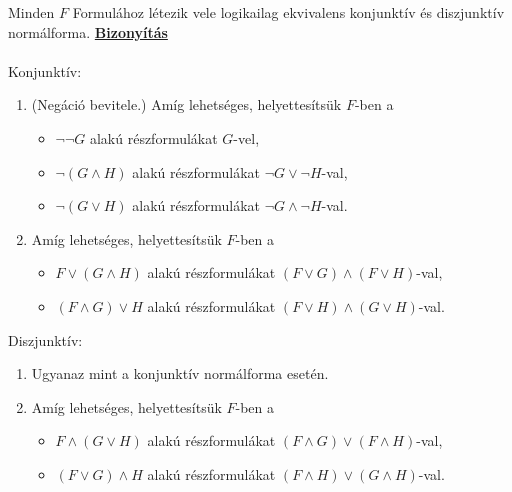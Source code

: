 \begin{frame}

\begin{tcolorbox}[squeezed title={Tétel: Konjunktív és diszjunktív normálforma létezése}]
Minden $F$ Formulához létezik vele logikailag ekvivalens konjunktív és diszjunktív normálforma.
\tcblower
\msmallskip
\underline{\textbf{Bizonyítás}}\\
\mmedskip
\\
Konjunktív:
\begin{enumerate}
\color{black}
	\item (Negáció bevitele.) Amíg lehetséges, helyettesítsük $F$-ben a
	\begin{itemize}
		\item $\neg \neg G$ alakú részformulákat $G$-vel,
		\item $\neg (G \land H)$ alakú részformulákat $\neg G \lor \neg H$-val,
		\item $\neg (G \lor H)$ alakú részformulákat $\neg G \land \neg H$-val.
	\end{itemize}
	\item Amíg lehetséges, helyettesítsük $F$-ben a
	\begin{itemize}
		\item $F \lor (G \land H)$ alakú részformulákat $(F \lor G) \land (F \lor H)$-val,
		\item $(F \land G) \lor H$ alakú részformulákat $(F \lor H) \land (G \lor H)$-val.
	\end{itemize}
\end{enumerate}
\mbigskip
Diszjunktív:
\begin{enumerate}
	\item Ugyanaz mint a konjunktív normálforma esetén.
	\item Amíg lehetséges, helyettesítsük $F$-ben a
	\begin{itemize}
		\item $F \land (G \lor H)$ alakú részformulákat $(F \land G) \lor (F \land H)$-val,
		\item $(F \lor G) \land H$ alakú részformulákat $(F \land H) \lor (G \land H)$-val.
	\end{itemize}
\end{enumerate}
\end{tcolorbox}

\end{frame}

